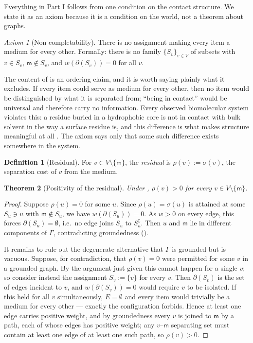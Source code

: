 \documentclass[11pt,twocolumn,a4paper]{article}
\theoremstyle{thmstyle}
\newtheorem{theorem}{Theorem}[section]
\theoremstyle{definition}
\newtheorem{definition}[theorem]{Definition}
\theoremstyle{remark}
\newtheorem{axiom}{Axiom}
\newcommand{\Gph}{\Gamma}
\newcommand{\V}{V}
\newcommand{\E}{E}
\newcommand{\wt}{w}
\newcommand{\med}{\mathsf{m}}
\newcommand{\cut}{\partial}
\newcommand{\co}{\complement}
\newcommand{\str}{\sigma}
\newcommand{\res}{\rho}
\begin{document}
Everything in Part I follows from one condition on the contact
structure. We state it as an axiom because it is a condition on the
world, not a theorem about graphs.

\begin{axiom}[Non-completability]
\label{ax:noncompletable}
There is no assignment making every item a medium for every other.
Formally: there is no family $\{S_v\}_{v \in \V}$ of subsets with
$v \in S_v$, $\med \notin S_v$, and $\wt(\cut(S_v)) = 0$ for all $v$.
\end{axiom}

The content of  is an ordering claim, and it is
worth saying plainly what it excludes. If every item could serve as
medium for every other, then no item would be distinguished by what
it is separated from; ``being in contact'' would be universal and
therefore carry no information. Every observed biomolecular system
violates this: a residue buried in a hydrophobic core is not in
contact with bulk solvent in the way a surface residue is, and this
difference is what makes structure meaningful at all
\citep{creighton1993,branden1999}. The axiom says only that some such
difference exists somewhere in the system.

\begin{definition}[Residual]
\label{def:residual}
For $v \in \V \setminus \{\med\}$, the \emph{residual} is
$\res(v) := \str(v)$, the separation cost of $v$ from the medium.
\end{definition}

\begin{theorem}[Positivity of the residual]
\label{thm:floor-derived}
Under , $\res(v) > 0$ for every
$v \in \V \setminus \{\med\}$.
\end{theorem}

\begin{proof}
Suppose $\res(u) = 0$ for some $u$. Since $\res(u) = \str(u)$ is
attained at some $S_u \ni u$ with $\med \notin S_u$, we have
$\wt(\cut(S_u)) = 0$. As $\wt > 0$ on every edge, this forces
$\cut(S_u) = \emptyset$, i.e.\ no edge joins $S_u$ to $S_u^\co$. Then
$u$ and $\med$ lie in different components of $\Gph$, contradicting
groundedness ().

It remains to rule out the degenerate alternative that $\Gph$ is
grounded but  is vacuous. Suppose, for
contradiction, that $\res(v) = 0$ were permitted for some $v$ in a
grounded graph. By the argument just given this cannot happen for a
single $v$; so consider instead the assignment $S_v := \{v\}$ for
every $v$. Then $\cut(S_v)$ is the set of edges incident to $v$, and
$\wt(\cut(S_v)) = 0$ would require $v$ to be isolated. If this held
for all $v$ simultaneously, $\E = \emptyset$ and every item would
trivially be a medium for every other --- exactly the configuration
 forbids. Hence at least one edge carries
positive weight, and by groundedness every $v$ is joined to $\med$ by
a path, each of whose edges has positive weight; any $v$--$\med$
separating set must contain at least one edge of at least one such
path, so $\res(v) > 0$.
\end{proof}
\end{document}
